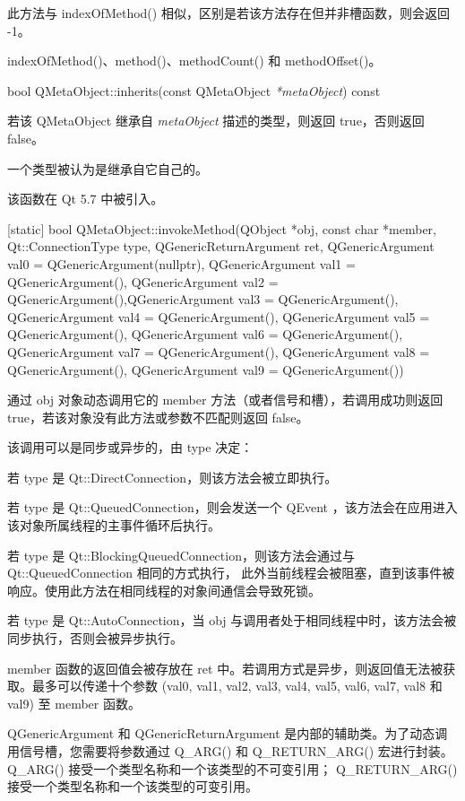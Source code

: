 此方法与 indexOfMethod() 相似，区别是若该方法存在但并非槽函数，则会返回 -1。

\begin{seeAlso}
indexOfMethod()、method()、methodCount() 和 methodOffset()。
\end{seeAlso}

bool QMetaObject::inherits(const QMetaObject \emph{*metaObject}) const

若该 QMetaObject 继承自 \emph{metaObject} 描述的类型，则返回 true，否则返回 false。

一个类型被认为是继承自它自己的。

该函数在 Qt 5.7 中被引入。

[static] bool QMetaObject::invokeMethod(QObject *obj, const char *member, 
 Qt::ConnectionType type, QGenericReturnArgument ret, 
 QGenericArgument val0 = QGenericArgument(nullptr), QGenericArgument val1 = QGenericArgument(), 
 QGenericArgument val2 = QGenericArgument(),QGenericArgument val3 = QGenericArgument(), 
 QGenericArgument val4 = QGenericArgument(), QGenericArgument val5 = QGenericArgument(), 
 QGenericArgument val6 = QGenericArgument(), QGenericArgument val7 = QGenericArgument(), 
 QGenericArgument val8 = QGenericArgument(), QGenericArgument val9 = QGenericArgument())

通过 obj 对象动态调用它的 member 方法（或者信号和槽），若调用成功则返回 true，若该对象没有此方法或参数不匹配则返回 false。

该调用可以是同步或异步的，由 type 决定：

\begin{compactitem}
\item 若 type 是 Qt::DirectConnection，则该方法会被立即执行。
\item 若 type 是 Qt::QueuedConnection，则会发送一个 QEvent ，该方法会在应用进入该对象所属线程的主事件循环后执行。
\item 若 type 是 Qt::BlockingQueuedConnection，则该方法会通过与 Qt::QueuedConnection 相同的方式执行，
	此外当前线程会被阻塞，直到该事件被响应。使用此方法在相同线程的对象间通信会导致死锁。
\item 若 type 是 Qt::AutoConnection，当 obj 与调用者处于相同线程中时，该方法会被同步执行，否则会被异步执行。
\end{compactitem}

member 函数的返回值会被存放在 ret 中。若调用方式是异步，则返回值无法被获取。最多可以传递十个参数 (val0, val1, val2, val3, val4, val5, val6, val7, val8 和 val9) 至 member 函数。

QGenericArgument 和 QGenericReturnArgument 是内部的辅助类。为了动态调用信号槽，您需要将参数通过 Q\_ARG() 和 Q\_RETURN\_ARG() 宏进行封装。
Q\_ARG() 接受一个类型名称和一个该类型的不可变引用；
Q\_RETURN\_ARG() 接受一个类型名称和一个该类型的可变引用。

